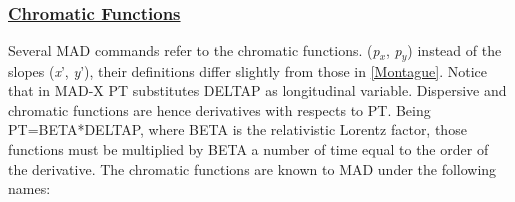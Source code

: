 











\subsubsection{\href{chrom}{Chromatic Functions}} Several MAD commands refer to the chromatic functions. (\textit{p$_x$}, \textit{p$_y$}) instead of the slopes (\textit{x}', \textit{y}'), their definitions differ slightly from those in \href{bibliography.html#montague}{[Montague]}. Notice that in MAD-X PT substitutes DELTAP as longitudinal variable. Dispersive and chromatic functions are hence derivatives with respects to PT. Being PT=BETA*DELTAP, where BETA is the relativistic Lorentz factor, those functions must be multiplied by BETA a number of time equal to the order of the derivative. The chromatic functions are known to MAD under the following names: 


